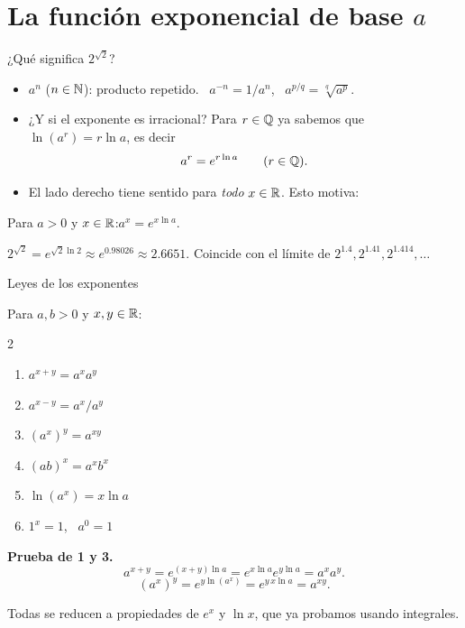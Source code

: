 \documentclass[10pt,aspectratio=169]{beamer}
\begin{document}
\section{La función exponencial de base $a$}

\begin{frame}{¿Qué significa $2^{\sqrt2}$?}
  \begin{itemize}
    \item $a^n$ ($n\in\mathbb{N}$): producto repetido. \ $a^{-n}=1/a^n$, \ $a^{p/q}=\sqrt[q]{a^p}$.
    \item ¿Y si el exponente es irracional? Para $r\in\mathbb{Q}$ ya sabemos que $\ln(a^r)=r\ln a$, es decir
      \[ a^r=e^{r\ln a}\qquad(r\in\mathbb{Q}). \]
    \item El lado derecho tiene sentido para \emph{todo} $x\in\mathbb{R}$. Esto motiva:
  \end{itemize}
  \begin{definicion}
    Para $a>0$ y $x\in\mathbb{R}$:\qquad $\boxed{a^x=e^{x\ln a}}$.
  \end{definicion}
  \begin{ejemplo}
    $2^{\sqrt2}=e^{\sqrt2\ln2}\approx e^{0.98026}\approx2.6651$.
    \quad Coincide con el límite de $2^{1.4},2^{1.41},2^{1.414},\dots$
  \end{ejemplo}
\end{frame}

\begin{frame}{Leyes de los exponentes}
  \begin{teorema}
    Para $a,b>0$ y $x,y\in\mathbb{R}$:
    \begin{multicols}{2}
    \begin{enumerate}
      \item $a^{x+y}=a^xa^y$
      \item $a^{x-y}=a^x/a^y$
      \item $(a^x)^y=a^{xy}$
      \item $(ab)^x=a^xb^x$
      \item $\ln(a^x)=x\ln a$
      \item $1^x=1$, \ $a^0=1$
    \end{enumerate}
    \end{multicols}
  \end{teorema}
  \textbf{Prueba de 1 y 3.}
  \[ a^{x+y}=e^{(x+y)\ln a}=e^{x\ln a}e^{y\ln a}=a^xa^y. \]
  \[ (a^x)^y=e^{y\ln(a^x)}=e^{y\,x\ln a}=a^{xy}. \]
  \begin{observacion}
    Todas se reducen a propiedades de $e^x$ y $\ln x$, que ya probamos usando integrales.
  \end{observacion}
\end{frame}
\end{document}
